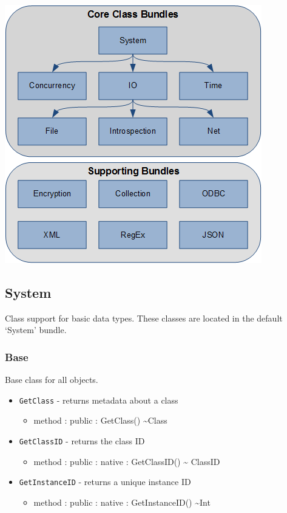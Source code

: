 \documentclass[11pt]{article}
\begin{document}
\begin{center}
  \includegraphics{../../images/classes.png}
\end{center}

\subsection{System}
Class support for basic data types. These classes are located in the
default `System' bundle.

\subsubsection{Base}
Base class for all objects.
\begin{itemize}
\item \texttt{GetClass} - returns metadata about a class
  \begin{itemize}
  \item method : public : GetClass() \textasciitilde Class
  \end{itemize}
\item \texttt{GetClassID} - returns the class ID
  \begin{itemize}
  \item method : public : native : GetClassID() \textasciitilde
    ClassID
  \end{itemize}
\item \texttt{GetInstanceID} - returns a unique instance ID
  \begin{itemize}
  \item method : public : native : GetInstanceID() \textasciitilde Int
  \end{itemize}
\end{itemize}
\end{document}
